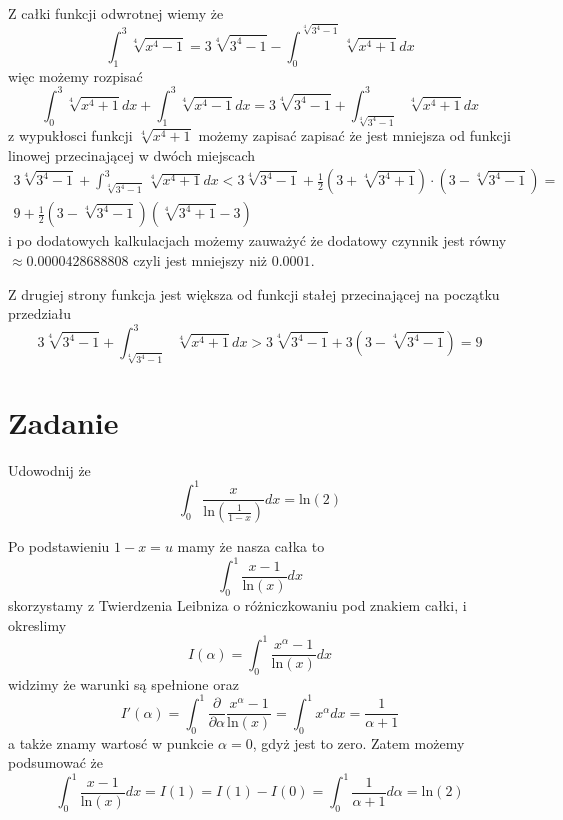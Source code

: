 \documentclass[11pt]{scrartcl}
\begin{document}
          Z całki funkcji odwrotnej wiemy że
          \[
            \int_1^3 \sqrt[4]{x^4 - 1} = 3 \sqrt[4]{3^4-1} - \int_0^{\sqrt[4]{3^4 -1} } \sqrt[4]{x^4 + 1} dx  
          \]
          więc możemy rozpisać
          \[
              \int_0^3 \sqrt[4]{x^4 + 1} dx + \int_1^3 \sqrt[4]{x^4 - 1} dx = 3 \sqrt[4]{3^4 - 1} + \int_{\sqrt[4]{3^4 -1} }^3 \sqrt[4]{x^4 + 1} dx 
          \]
          z wypukłosci funkcji $\sqrt[4]{x^4 + 1} $ możemy zapisać zapisać że jest mniejsza od funkcji linowej przecinającej w dwóch miejscach
          \begin{gather*}
              3 \sqrt[4]{3^4 - 1} + \int_{\sqrt[4]{3^4 -1} }^3 \sqrt[4]{x^4 + 1} dx < 3 \sqrt[4]{3^4 - 1} + \frac{1}{2} \left ( 3 + \sqrt[4]{3^4 + 1}  \right ) \cdot \left ( 3 - \sqrt[4]{3^4 - 1}  \right ) = \\ 9 + \frac{1}{2} ( 3 - \sqrt[4]{3^4 - 1} ) ( \sqrt[4]{3^4 + 1} - 3 )    
            \end{gather*}
          i po dodatowych kalkulacjach możemy zauważyć że dodatowy czynnik jest równy $\approx 0.0000428688808$ czyli jest mniejszy niż $0.0001$.
          
          Z drugiej strony funkcja jest większa od funkcji stałej przecinającej na początku przedziału
          \[
              3 \sqrt[4]{3^4 - 1} + \int_{\sqrt[4]{3^4 -1} }^3 \sqrt[4]{x^4 + 1} dx > 3 \sqrt[4]{3^4 - 1} + 3 \left ( 3 - \sqrt[4]{3^4 - 1}  \right ) = 9 
            \]
        \newpage 

        \section{Zadanie}
            \begin{zadanie}
                Udowodnij że 
                \[
                    \int_0^1 \frac{x}{\text{ln} \left ( \frac{1}{1-x} \right ) } dx = \text{ln} \left ( 2 \right ) 
                \]
                
            \end{zadanie}
            
            Po podstawieniu $1 - x = u$ mamy że nasza całka to
            \[
                \int_0^1 \frac{x - 1}{\text{ln} \left ( x \right ) } dx
            \]
            skorzystamy z Twierdzenia Leibniza o różniczkowaniu pod znakiem całki, i okreslimy
            \[
            I(\alpha ) = \int_0^1 \frac{x^{\alpha} - 1}{\text{ln} \left ( x \right ) } dx
            \]
            widzimy że warunki są spełnione oraz 
            \[
              I'(\alpha ) = \int_0^1 \frac{\partial}{\partial \alpha } \frac{x^{\alpha } - 1}{\text{ln} \left ( x \right ) } = \int_0^1 x^{\alpha } dx = \frac{1}{\alpha + 1}
            \]
            a także znamy wartosć w punkcie $\alpha = 0 $, gdyż jest to zero.
            Zatem możemy podsumować że
            \[
                \int_0^1 \frac{x - 1}{\text{ln} \left ( x \right ) } dx = I(1) = I(1) - I(0) = \int_0^1 \frac{1}{\alpha + 1} d \alpha = \text{ln} \left ( 2 \right ) 
            \]
            
\end{document}
